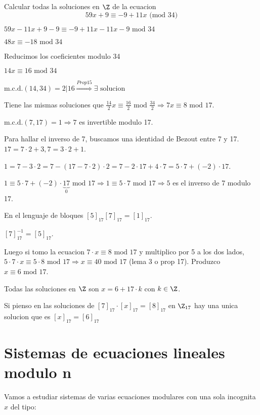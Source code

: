 \begin{example}
	Calcular todas la soluciones en \(\Z \) de la ecuacion
	\[
		59x + 9 \equiv -9 + 11x \text{ (mod 34)}
	\]

	\(59x - 11x + 9 - 9 \equiv -9 + 11x - 11x - 9 \text{ mod } 34 \)

	\(48x \equiv -18 \text{ mod 34 } \)

	Reducimos los coeficientes modulo 34

	\(14x \equiv 16 \text{ mod 34 } \)

	\(\mathrm{m.c.d.}(14,34) = 2 | 16 \overset{Prop 15}{\Rightarrow} \exists \text{ solucion}  \)

	Tiene las mismas soluciones que \(\frac{14}{2}x \equiv \frac{16}{2}  \text{ mod } \frac{34}{2} \Rightarrow 7x \equiv 8 \text{ mod } 17 \).

	\(\mathrm{m.c.d.}(7,17) = 1 \Rightarrow 7 \) es invertible modulo 17.

	Para hallar el inverso de 7, buscamos una identidad de Bezout entre 7 y 17. \(17 = 7 \cdot 2 + 3, 7 = 3 \cdot 2 + 1 \).

	\(1 = 7 - 3 \cdot 2 = 7 - (17 - 7 \cdot 2) \cdot 2 = 7 - 2 \cdot 17 + 4 \cdot 7 = 5 \cdot 7 + (-2) \cdot 17 \).

	\(1 \equiv  5 \cdot 7 + (-2) \cdot \underbrace{17}_0 \text{ mod } 17  \Rightarrow 1 \equiv 5 \cdot 7 \text{ mod } 17 \Rightarrow 5 \) es el inverso de 7 modulo 17.

	En el lenguaje de bloques \([5]_{17} [7]_{17} = [1]_{17}\).

	\([7]^{-1}_{17} = [5]_{17} \).

	Luego si tomo la ecuacion \(7 \cdot x \equiv 8 \text{ mod } 17 	\) y multiplico por 5 a los dos lados, \(5 \cdot 7 \cdot x \equiv 5 \cdot 8 \text{ mod } 17 \Rightarrow x \equiv 40 \text{ mod } 17 \) (lema 3 o prop 17). Produzco \(x \equiv 6 \text{ mod }17 \).

	Todas las soluciones en \(\Z \) son \(x = 6 + 17 \cdot k \) con \(k \in \Z \).

	Si pienso en las soluciones de \([7]_{17} \cdot [x]_{17} = [8 ]_{17}\) en \(\Z_{17 }\) hay una unica solucion que es \([x]_{17} = [6]_{17}\)
\end{example}

\section{Sistemas de ecuaciones lineales modulo n}

Vamos a estudiar sistemas de varias ecuaciones modulares con una sola incognita \(x \) del tipo:

